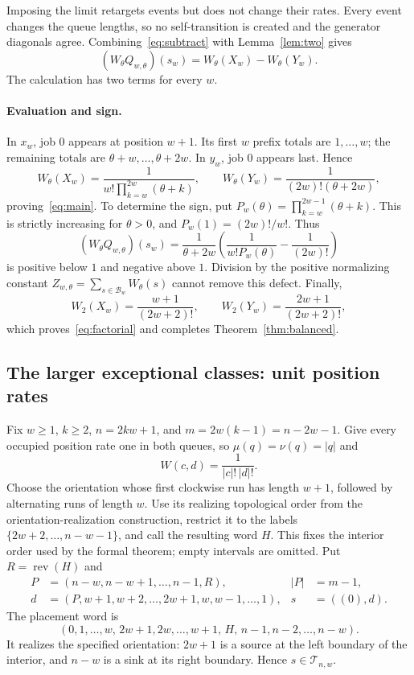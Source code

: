 \documentclass[11pt]{article}
\theoremstyle{remark}
\newcommand{\rev}{\operatorname{rev}}
\newcommand{\B}{\mathcal B_w}
\newcommand{\W}{W_\theta}
\newcommand{\Qw}{Q_{w,\theta}}
\newcommand{\T}{\mathcal T_{n,w}}
\begin{document}
Imposing the limit retargets events but does not change their rates. Every event changes the queue lengths, so no self-transition is created and the generator diagonals agree. Combining~\eqref{eq:subtract} with Lemma~\ref{lem:two} gives
\begin{equation}\label{eq:two}
 (\W\Qw)(s_w)=\W(X_w)-\W(Y_w).
\end{equation}
The calculation has two terms for every $w$.

\paragraph{Evaluation and sign.}
In $x_w$, job $0$ appears at position $w+1$. Its first $w$ prefix totals are $1,\ldots,w$; the remaining totals are $\theta+w,\ldots,\theta+2w$. In $y_w$, job $0$ appears last. Hence
\[
 \W(X_w)=\frac{1}{w!\prod_{k=w}^{2w}(\theta+k)},\qquad
 \W(Y_w)=\frac{1}{(2w)!(\theta+2w)},
\]
proving~\eqref{eq:main}. To determine the sign, put $P_w(\theta)=\prod_{k=w}^{2w-1}(\theta+k)$. This is strictly increasing for $\theta>0$, and $P_w(1)=(2w)!/w!$. Thus
\[
 (\W\Qw)(s_w)=\frac{1}{\theta+2w}
 \left(\frac{1}{w!P_w(\theta)}-\frac{1}{(2w)!}\right)
\]
is positive below $1$ and negative above $1$. Division by the positive normalizing constant $Z_{w,\theta}=\sum_{s\in\B}\W(s)$ cannot remove this defect. Finally,
\[
 W_2(X_w)=\frac{w+1}{(2w+2)!},\qquad
 W_2(Y_w)=\frac{2w+1}{(2w+2)!},
\]
which proves~\eqref{eq:factorial} and completes Theorem~\ref{thm:balanced}.


\subsection{The larger exceptional classes: unit position rates}\label{sec:larger}
Fix $w\ge1$, $k\ge2$, $n=2kw+1$, and $m=2w(k-1)=n-2w-1$. Give every occupied position rate one in both queues, so $\mu(q)=\nu(q)=|q|$ and
\[
 W(c,d)=\frac1{|c|!\,|d|!}.
\]
Choose the orientation whose first clockwise run has length $w+1$, followed by alternating runs of length $w$. Use its realizing topological order from the orientation-realization construction, restrict it to the labels $\{2w+2,\ldots,n-w-1\}$, and call the resulting word $H$. This fixes the interior order used by the formal theorem; empty intervals are omitted. Put $R=\rev(H)$ and
\begin{align*}
 P&=(n-w,n-w+1,\ldots,n-1,R),& |P|&=m-1,\\
 d&=(P,w+1,w+2,\ldots,2w+1,w,w-1,\ldots,1),& s&=((0),d).
\end{align*}
The placement word is
\[
 (0,1,\ldots,w,\,2w+1,2w,\ldots,w+1,\,H,\,n-1,n-2,\ldots,n-w).
\]
It realizes the specified orientation: $2w+1$ is a source at the left boundary of the interior, and $n-w$ is a sink at its right boundary. Hence $s\in\T$.
\end{document}
